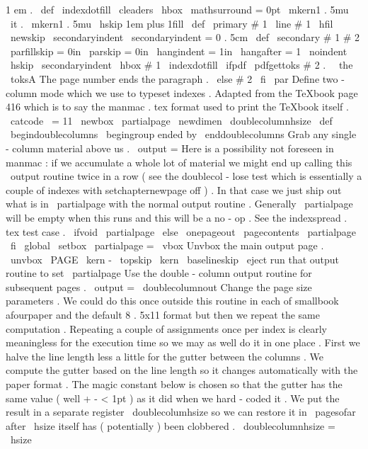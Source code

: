 {1
em
.
\
def
\
indexdotfill
{
\
cleaders
\
hbox
{
\
mathsurround
=
0pt
\
mkern1
.
5mu
{
\
it
.
}
\
mkern1
.
5mu
}
\
hskip
1em
plus
1fill
}
\
def
\
primary
#
1
{
\
line
{
#
1
\
hfil
}
}
\
newskip
\
secondaryindent
\
secondaryindent
=
0
.
5cm
\
def
\
secondary
#
1
#
2
{
{
%
\
parfillskip
=
0in
\
parskip
=
0in
\
hangindent
=
1in
\
hangafter
=
1
\
noindent
\
hskip
\
secondaryindent
\
hbox
{
#
1
}
\
indexdotfill
\
ifpdf
\
pdfgettoks
#
2
.
\
\
the
\
toksA
%
The
page
number
ends
the
paragraph
.
\
else
#
2
\
fi
\
par
}
}
%
Define
two
-
column
mode
which
we
use
to
typeset
indexes
.
%
Adapted
from
the
TeXbook
page
416
which
is
to
say
%
the
manmac
.
tex
format
used
to
print
the
TeXbook
itself
.
\
catcode
\
=
11
\
newbox
\
partialpage
\
newdimen
\
doublecolumnhsize
\
def
\
begindoublecolumns
{
\
begingroup
%
ended
by
\
enddoublecolumns
%
Grab
any
single
-
column
material
above
us
.
\
output
=
{
%
%
%
Here
is
a
possibility
not
foreseen
in
manmac
:
if
we
accumulate
a
%
whole
lot
of
material
we
might
end
up
calling
this
\
output
%
routine
twice
in
a
row
(
see
the
doublecol
-
lose
test
which
is
%
essentially
a
couple
of
indexes
with
setchapternewpage
off
)
.
In
%
that
case
we
just
ship
out
what
is
in
\
partialpage
with
the
normal
%
output
routine
.
Generally
\
partialpage
will
be
empty
when
this
%
runs
and
this
will
be
a
no
-
op
.
See
the
indexspread
.
tex
test
case
.
\
ifvoid
\
partialpage
\
else
\
onepageout
{
\
pagecontents
\
partialpage
}
%
\
fi
%
\
global
\
setbox
\
partialpage
=
\
vbox
{
%
%
Unvbox
the
main
output
page
.
\
unvbox
\
PAGE
\
kern
-
\
topskip
\
kern
\
baselineskip
}
%
}
%
\
eject
%
run
that
output
routine
to
set
\
partialpage
%
%
Use
the
double
-
column
output
routine
for
subsequent
pages
.
\
output
=
{
\
doublecolumnout
}
%
%
%
Change
the
page
size
parameters
.
We
could
do
this
once
outside
this
%
routine
in
each
of
smallbook
afourpaper
and
the
default
8
.
5x11
%
format
but
then
we
repeat
the
same
computation
.
Repeating
a
couple
%
of
assignments
once
per
index
is
clearly
meaningless
for
the
%
execution
time
so
we
may
as
well
do
it
in
one
place
.
%
%
First
we
halve
the
line
length
less
a
little
for
the
gutter
between
%
the
columns
.
We
compute
the
gutter
based
on
the
line
length
so
it
%
changes
automatically
with
the
paper
format
.
The
magic
constant
%
below
is
chosen
so
that
the
gutter
has
the
same
value
(
well
+
-
<
1pt
)
%
as
it
did
when
we
hard
-
coded
it
.
%
%
We
put
the
result
in
a
separate
register
\
doublecolumhsize
so
we
%
can
restore
it
in
\
pagesofar
after
\
hsize
itself
has
(
potentially
)
%
been
clobbered
.
%
\
doublecolumnhsize
=
\
hsize
}}
